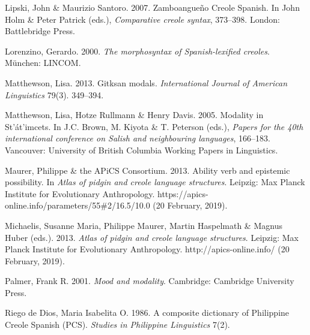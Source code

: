 \begin{styleBibliography}
Lipski, John \& Maurizio Santoro. 2007. Zamboangueño Creole Spanish. In John Holm \& Peter Patrick (eds.), \textit{Comparative creole syntax}, 373–398. London: Battlebridge Press.
\end{styleBibliography}

\begin{styleBibliography}
Lorenzino, Gerardo. 2000. \textit{The morphosyntax of Spanish-lexified creoles}. München: LINCOM.
\end{styleBibliography}

\begin{styleBibliography}
Matthewson, Lisa. 2013. Gitksan modals. \textit{International Journal of American Linguistics} 79(3). 349–394.
\end{styleBibliography}

\begin{styleBibliography}
Matthewson, Lisa, Hotze Rullmann \& Henry Davis. 2005. Modality in St’át’imcets. In J.C. Brown, M. Kiyota \& T. Peterson (eds.), \textit{Papers for the 40th international conference on Salish and neighbouring languages}, 166–183. Vancouver: University of British Columbia Working Papers in Linguistics.
\end{styleBibliography}

\begin{styleBibliography}
Maurer, Philippe \& the APiCS Consortium. 2013. Ability verb and epistemic possibility. In \textit{Atlas of pidgin and creole language structures}. Leipzig: Max Planck Institute for Evolutionary Anthropology. https://apics-online.info/parameters/55\#2/16.5/10.0 (20 February, 2019).
\end{styleBibliography}

\begin{styleBibliography}
Michaelis, Susanne Maria, Philippe Maurer, Martin Haspelmath \& Magnus Huber (eds.). 2013. \textit{Atlas of pidgin and creole language structures}. Leipzig: Max Planck Institute for Evolutionary Anthropology. http://apics-online.info/ (20 February, 2019).
\end{styleBibliography}

\begin{styleBibliography}
Palmer, Frank R. 2001. \textit{Mood and modality}. Cambridge: Cambridge University Press.
\end{styleBibliography}

\begin{styleBibliography}
Riego de Dios, Maria Isabelita O. 1986. A composite dictionary of Philippine Creole Spanish (PCS). \textit{Studies in Philippine Linguistics} 7(2).
\end{styleBibliography}

